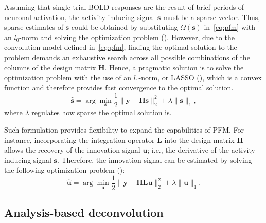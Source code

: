 Assuming that single-trial BOLD responses are the result of brief periods of neuronal activation, the activity-inducing signal \(\mathbf{s}\) must be a sparse vector. Thus, sparse estimates of \(\mathbf{s}\) could be obtained by substituting \(\Omega(\mathbf{s})\) in~\eqref{eq:pfm} with an \(l_0\)-norm and solving the optimization problem (\citealt{bruckstein2009SparseSolutionsSystems}). However, due to the convolution model defined in~\eqref{eq:pfm}, finding the optimal solution to the problem demands an exhaustive search across all possible combinations of the columns of the design matrix \(\mathbf{H}\). Hence, a pragmatic solution is to solve the optimization problem with the use of an \(l_1\)-norm, or LASSO (\citealt{tibshirani1996RegressionShrinkageSelection}), which is a convex function and therefore provides fast convergence to the optimal solution.
\begin{equation}
    \label{eq:pfm_spike}
    \hat{\mathbf{s}} = \arg \min_{\mathbf{s}} \frac{1}{2} \| \mathbf{y} - \mathbf{Hs} \|_2^2 + \lambda \| \mathbf{s} \|_1,
\end{equation}
where \(\lambda\) regulates how sparse the optimal solution is.

Such formulation provides flexibility to expand the capabilities of PFM. For instance, incorporating the integration operator \(\mathbf{L}\) into the design matrix \(\mathbf{H}\) allows the recovery of the innovation signal \(\mathbf{u}\); i.e., the derivative of the activity-inducing signal \(\mathbf{s}\). Therefore, the innovation signal can be estimated by solving the following optimization problem (\citealt{cherkaoui2019SparsitybasedBlindDeconvolution,urunuela2020StabilityBasedSparseParadigm}):
\begin{equation}
    \label{eq:pfm_block}
    \hat{\mathbf{u}} = \arg \min_{\mathbf{u}} \frac{1}{2} \| \mathbf{y} - \mathbf{HLu} \|_2^2 + \lambda \| \mathbf{u} \|_1.
\end{equation}


\subsection{Analysis-based deconvolution}

